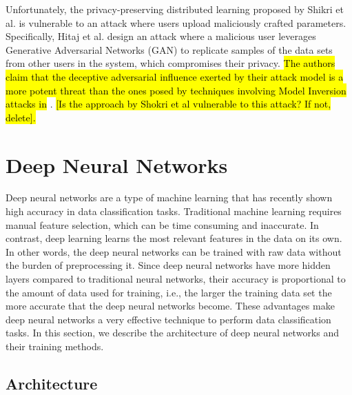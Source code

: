 \documentclass[conference]{IEEEtran}
\begin{document}
Unfortunately, the privacy-preserving distributed learning proposed by Shikri et al. \cite{shokri2015privacy} is vulnerable to an
attack where users upload maliciously crafted parameters. Specifically, Hitaj  et al. \cite{hitaj2017deep} design
an attack where a malicious user 
leverages Generative Adversarial Networks (GAN) to replicate samples of the data sets from other users in the system, which compromises
their privacy. 
\hl{The authors claim that the  deceptive adversarial influence exerted by their attack model is a more potent threat than the ones
posed by techniques involving Model Inversion attacks in} \cite{deng2012mnist}.\hl{ [Is the approach by Shokri et al vulnerable to
this attack? If not, delete]. }

\section{Deep Neural Networks}
Deep neural networks are a type of machine learning that has recently shown high accuracy in data classification tasks. Traditional
machine learning requires manual feature selection, which can be time consuming and inaccurate. In contrast, deep learning
learns the most relevant features in the data on its own. In other words, the deep neural networks can be trained with raw data without
the burden of preprocessing it. Since deep neural networks have more hidden layers compared to traditional neural networks, their
accuracy is proportional to the amount of data used for training, i.e., the larger the training data set the more accurate that the
deep neural networks become. These advantages make deep neural networks a very effective technique to perform data classification
tasks. In this section, we describe the architecture of deep neural networks and their training methods. 


\subsection{Architecture}
\end{document}
